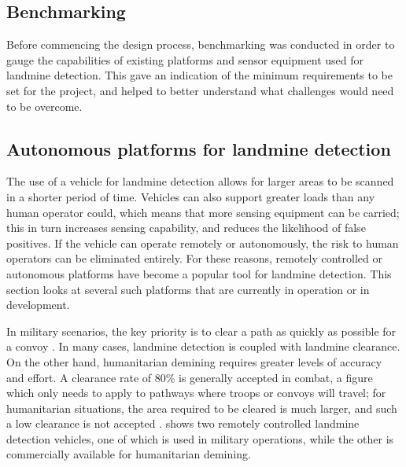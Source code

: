 \documentclass[main.tex]{subfiles}
\begin{document}
\begin{appendices}

\chapter{Benchmarking}
Before commencing the design process, benchmarking was conducted in order to gauge the capabilities of existing platforms and sensor equipment used for landmine detection. This gave an indication of the minimum requirements to be set for the project, and helped to better understand what challenges would need to be overcome.

\section{Autonomous platforms for landmine detection}
The use of a vehicle for landmine detection allows for larger areas to be scanned in a shorter period of time. Vehicles can also support greater loads than any human operator could, which means that more sensing equipment can be carried; this in turn increases sensing capability, and reduces the likelihood of false positives. If the vehicle can operate remotely or autonomously, the risk to human operators can be eliminated entirely. For these reasons, remotely controlled or autonomous platforms have become a popular tool for landmine detection. This section looks at several such platforms that are currently in operation or in development. 


In military scenarios, the key priority is to clear a path as quickly as possible for a convoy \parencite{portugal2014}. In many cases, landmine detection is coupled with landmine clearance. On the other hand, humanitarian demining requires greater levels of accuracy and effort. A clearance rate of 80\% is generally accepted in combat, a figure which only needs to apply to pathways where troops or convoys will travel; for humanitarian situations, the area required to be cleared is much larger, and such a low clearance is not accepted \parencite{habib2008}.  shows two remotely controlled landmine detection vehicles, one of which is used in military operations, while the other is commercially available for humanitarian demining.   


\end{appendices}
\end{document}
